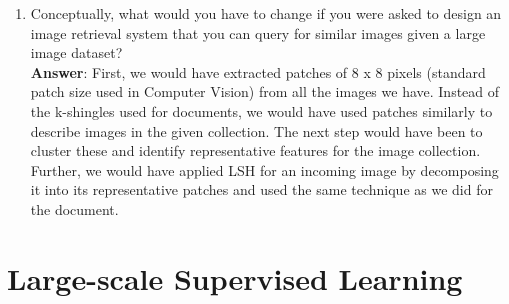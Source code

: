 \documentclass[11pt]{article}
\begin{document}
\begin{enumerate}
\item Conceptually, what would you have to change if you were asked to design an image
  retrieval system that you can query for similar images given a large image
  dataset? \\

\textbf{Answer}: First, we would have extracted patches of 8 x 8 pixels
(standard patch size used in Computer Vision) from all the images we
have. Instead of the k-shingles used for documents, we would have used patches
similarly to describe images in the given collection. The next step
would have been to cluster these and identify representative features
for the image collection. Further, we would have applied LSH for an
incoming image by decomposing it into its representative patches and
used the same technique as we did for the document.

\end{enumerate}

\section{Large-scale Supervised Learning}
\end{document}

